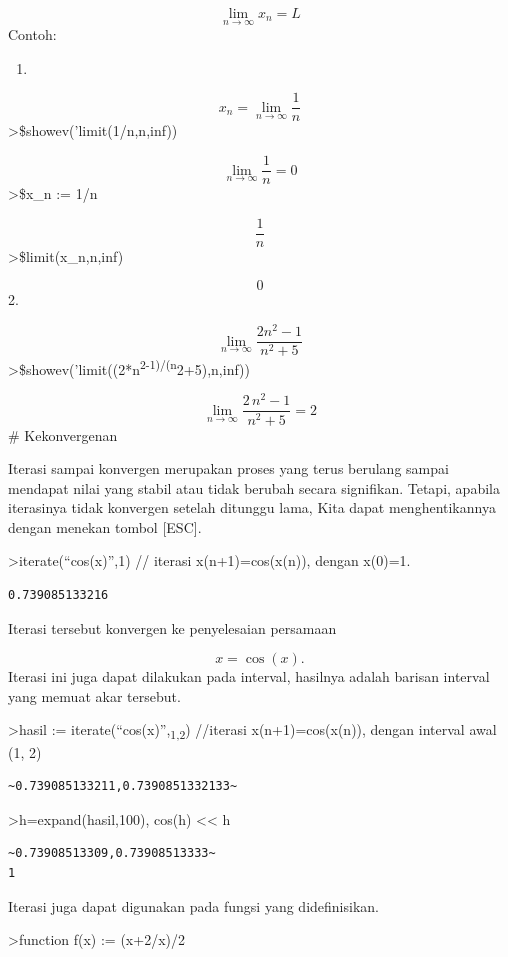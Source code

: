 \documentclass[
]{book}
\providecommand{\tightlist}{%
  \setlength{\itemsep}{0pt}\setlength{\parskip}{0pt}}
\begin{document}
\[\lim_{n \to \infty}x_n=L\]Contoh:

\begin{enumerate}
\def\labelenumi{\arabic{enumi}.}
\tightlist
\item
\end{enumerate}

\[x_n = \lim_{n \to \infty}\frac{1}{n}\]\textgreater\$showev('limit(1/n,n,inf))

\[\lim_{n\rightarrow \infty }{\frac{1}{n}}=0\]\textgreater\$x\_n := 1/n

\[\frac{1}{n}\]\textgreater\$limit(x\_n,n,inf)

\[0\]2.

\[\lim_{n\to\infty}\frac{2n^2-1}{n^2+5}\]\textgreater\$showev('limit((2*n\textsuperscript{2-1)/(n}2+5),n,inf))

\[\lim_{n\rightarrow \infty }{\frac{2\,n^2-1}{n^2+5}}=2\]\# Kekonvergenan

Iterasi sampai konvergen merupakan proses yang terus berulang sampai mendapat nilai yang stabil atau tidak berubah secara signifikan. Tetapi, apabila iterasinya tidak konvergen setelah ditunggu lama, Kita dapat menghentikannya dengan menekan tombol {[}ESC{]}.

\textgreater iterate(``cos(x)'',1) // iterasi x(n+1)=cos(x(n)), dengan x(0)=1.

\begin{verbatim}
0.739085133216
\end{verbatim}

Iterasi tersebut konvergen ke penyelesaian persamaan

\[x = \cos(x).\]Iterasi ini juga dapat dilakukan pada interval, hasilnya adalah barisan interval yang memuat akar tersebut.

\textgreater hasil := iterate(``cos(x)'',\textsubscript{1,2}) //iterasi x(n+1)=cos(x(n)), dengan interval awal (1, 2)

\begin{verbatim}
~0.739085133211,0.7390851332133~
\end{verbatim}

\textgreater h=expand(hasil,100), cos(h) \textless\textless{} h

\begin{verbatim}
~0.73908513309,0.73908513333~
1
\end{verbatim}

Iterasi juga dapat digunakan pada fungsi yang didefinisikan.

\textgreater function f(x) := (x+2/x)/2
\end{document}
